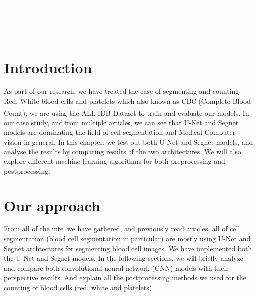 \vspace*{\fill}
\begin{center}
    {\color{Black} \rule{\linewidth}{1.2mm} }\\
\vspace{0.25in}
{\centering{}}
\vspace{0.35in}\\
    {\color{Black} \rule{\linewidth}{1.2mm} }
\end{center}
\vspace*{\fill}
\setcounter{section}{0}

\newpage

\section{Introduction}
\vspace{0.2in}
\hspace{\parindent}
As part of our research, we have treated the case of segmenting and counting Red, White blood cells and platelets which also known as CBC (Complete Blood Count), we are using the ALL-IDB\textsuperscript{\cite{pm77-2n23-20}} Dataset to train and evaluate our models.
In our case study, and from multiple articles, we can see that U-Net and Segnet models are dominating the field of cell segmentation and Medical Computer vision in general.
In this chapter, we test out both U-Net and Segnet models, and analyse the results by comparing results of the two architectures.
We will also explore different machine learning algorithms for both preprocessing and postprocessing.

\section{Our approach}
\vspace{0.2in}
\hspace{\parindent}
From all of the intel we have gathered, and previously read articles, all of cell segmentation (blood cell segmentation in particular) are mostly using U-Net and Segnet archtectures for segmenting blood cell images.
We have implemented both the U-Net and Segnet models.
In the following sections, we will briefly analyze and compare both convolutional neural network (CNN) models with their perspective results.
And explain all the postprocessing methods we used for the counting of blood cells (red, white and platelets)

